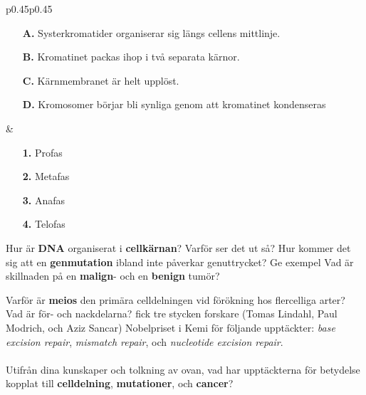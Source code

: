 \documentclass{exam}
\begin{document}
\begin{questions}
\begin{tabular}{p{0.45\textwidth}p{0.45\textwidth}}
  \begin{minipage}[t]{\linewidth}
    \begin{itemize}
      \item[\textbf{A.}] Systerkromatider organiserar sig längs cellens mittlinje.
      \item[\textbf{B.}] Kromatinet packas ihop i två separata kärnor.
      \item[\textbf{C.}] Kärnmembranet är helt upplöst.
      \item[\textbf{D.}] Kromosomer börjar bli synliga genom att kromatinet kondenseras
    \end{itemize}
  \end{minipage}
  &
  \begin{minipage}[t]{\linewidth}
    \begin{itemize}
      \item[\textbf{1.}] Profas
      \item[\textbf{2.}] Metafas
      \item[\textbf{3.}] Anafas
      \item[\textbf{4.}] Telofas
    \end{itemize}
  \end{minipage}
\end{tabular}
\question 
\vspace{10mm} %
Hur är \textbf{DNA} organiserat i \textbf{cellkärnan}? Varför ser det ut så? 
\vspace{40mm} %
\question 
Hur kommer det sig att en \textbf{genmutation} ibland inte påverkar genuttrycket? Ge exempel
\vspace{40mm} %
\question 
Vad är skillnaden på en \textbf{malign}- och en \textbf{benign} tumör?

\break
\vspace{5mm} %
\begin{center}
\end{center}
\vspace{5mm} %

\question 
Varför är \textbf{meios} den primära celldelningen vid förökning hos flercelliga arter? Vad är för- och nackdelarna?
\vspace{80mm} %
 fick tre stycken forskare (Tomas Lindahl, Paul Modrich, och Aziz Sancar) Nobelpriset i Kemi för följande upptäckter: \textit{ base excision repair}, \textit{mismatch repair}, och \textit{nucleotide excision repair}. 
\\ \\
Utifrån dina kunskaper och tolkning av ovan, vad har upptäckterna för betydelse kopplat till \textbf{celldelning}, \textbf{mutationer}, och \textbf{cancer}? 
\vspace{60mm}


\end{questions}
\end{document}
